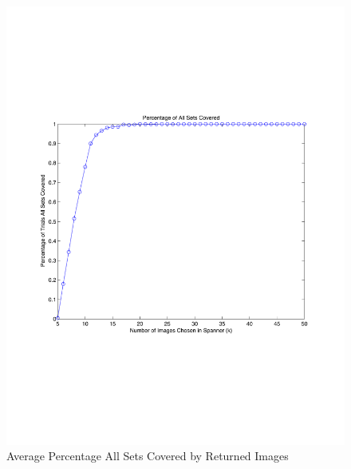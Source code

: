 \begin{figure} 
\begin{centering}
    \includegraphics[scale=0.35]{figures/50_image_sets/percAllSetsCovered_50_images.pdf}
    \caption{Average Percentage All Sets Covered by Returned Images}
    \label{fig:spannerAvgPercAllSetsCov}
\end{centering}
\end{figure}



